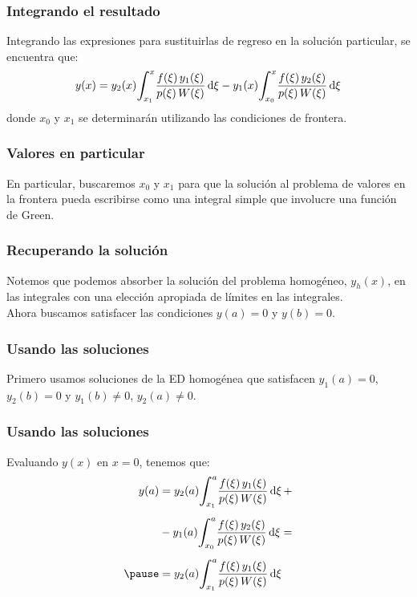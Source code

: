 \documentclass[12pt]{beamer}
\begin{document}
\begin{frame}
\frametitle{Integrando el resultado}
Integrando las expresiones para sustituirlas de regreso en la solución particular, se encuentra que:
\pause
\begin{align*}
y (x) = y_{2} (x) \scaleint{6ex}_{\bs x_{1}}^{x} \dfrac{f (\xi) \, y_{1} (\xi)}{p (\xi) \, W (\xi)} \dd{\xi} - y_{1} (x) \scaleint{6ex}_{\bs x_{0}}^{x} \dfrac{f (\xi) \, y_{2} (\xi)}{p (\xi) \, W (\xi)} \dd{\xi}
\end{align*}
donde $x_{0}$ y $x_{1}$ se determinarán utilizando las condiciones de frontera.
\end{frame}

\begin{frame}
\frametitle{Valores en particular}
En particular, buscaremos $x_{0}$ y $x_{1}$ para que la solución al problema de valores en la frontera pueda escribirse como una integral simple que involucre una función de Green.
\end{frame}

\begin{frame}
\frametitle{Recuperando la solución}
Notemos que podemos absorber la solución del problema homogéneo, $y_{h} (x)$, en las integrales con una elección apropiada de límites en las integrales.
\\
\bigskip
\pause
Ahora buscamos satisfacer las condiciones $y (a) = 0$ y $y (b) = 0$.
\end{frame}

\begin{frame}
\frametitle{Usando las soluciones}
Primero usamos soluciones de la ED homogénea que satisfacen $y_{1} (a) = 0$, $y_{2} (b) = 0$ y $y_{1} (b) \neq 0$, $y_{2} (a) \neq 0$.
\end{frame}

\begin{frame}
\frametitle{Usando las soluciones}
Evaluando $y (x)$ en $x = 0$, tenemos que:
\pause
\begin{eqnarray}
\begin{aligned}[b]
y (a) &= y_{2} (a) \scaleint{6ex}_{\bs x_{1}}^{a} \dfrac{f (\xi) \, y_{1} (\xi)}{p (\xi) \, W (\xi)} \dd{\xi} + \\[0.5em] 
&- y_{1} (a) \scaleint{6ex}_{\bs x_{0}}^{a} \dfrac{f (\xi) \, y_{2} (\xi)}{p (\xi) \, W (\xi)} \dd{\xi} = \\[0.5em] \pause
&= y_{2} (a) \scaleint{6ex}_{\bs x_{1}}^{a} \dfrac{f (\xi) \, y_{1} (\xi)}{p (\xi) \, W (\xi)} \dd{\xi}
\end{aligned}
\label{eq:ecuacion_07_27}
\end{eqnarray}
\end{frame}
\end{document}
